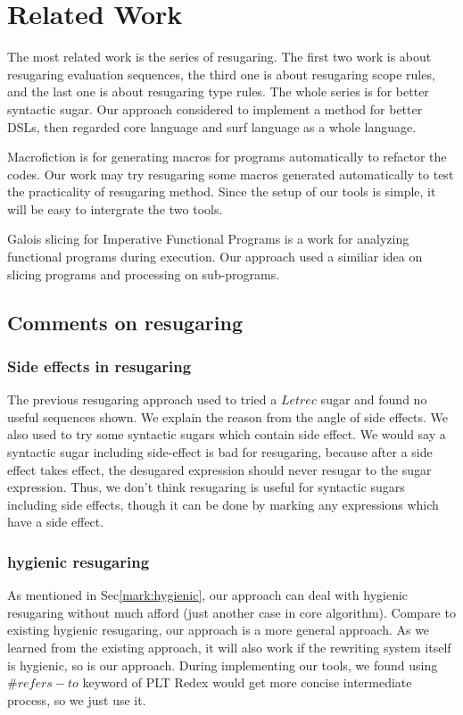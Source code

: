 \section{Related Work}


The most related work is the series of resugaring\cite{resugaring,hygienic,resugaringtype,resugaringscope}. The first two work is about resugaring evaluation sequences, the third one is about resugaring scope rules, and the last one is about resugaring type rules. The whole series is for better syntactic sugar. Our approach considered to implement a method for better DSLs, then regarded core language and surf language as a whole language.

Macrofiction\cite{Macrofication} is for generating macros for programs automatically to refactor the codes. Our work may try resugaring some macros generated automatically to test the practicality of resugaring method. Since the setup of our tools is simple, it will be easy to intergrate the two tools.

Galois slicing for Imperative Functional Programs\cite{slicing} is a work for analyzing functional programs during execution. Our approach used a similiar idea on slicing programs and processing on sub-programs.

\subsection{Comments on resugaring}

\subsubsection{Side effects in resugaring}
\label{mark:side}
The previous resugaring approach used to tried a $Letrec$ sugar and found no useful sequences shown. We explain the reason from the angle of side effects. We also used to try some syntactic sugars which contain side effect. We would say a syntactic sugar including side-effect is bad for resugaring, because after a side effect takes effect, the desugared expression should never resugar to the sugar expression. Thus, we don't think resugaring is useful for syntactic sugars  including side effects, though it can be done by marking any expressions which have a side effect.

\subsubsection{hygienic resugaring}As mentioned in Sec\ref{mark:hygienic}, our approach can deal with hygienic resugaring without much afford (just another case in core algorithm). Compare to existing hygienic resugaring\cite{hygienic}, our approach is a more general approach. As we learned from the existing approach, it will also work if the rewriting system itself is hygienic, so is our approach. During implementing our tools, we found using $\#refers-to$ keyword of PLT Redex would get more concise intermediate process, so we just use it.

